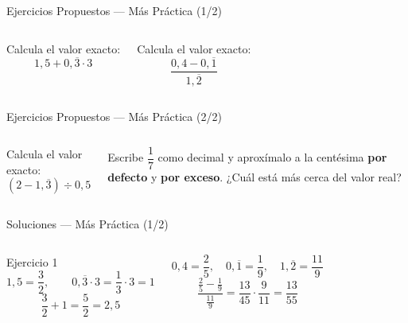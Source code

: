 \documentclass[aspectratio=169]{beamer}
\begin{document}
\begin{frame}{Ejercicios Propuestos — Más Práctica \textnormal{(1/2)}}
  \begin{columns}[T]
    \begin{mwejercicio}
      Calcula el valor exacto:
      \[
        1{,}5 + 0{,}\overline{3} \cdot 3
      \]
    \end{mwejercicio}
    \begin{mwejercicio}
      Calcula el valor exacto:
      \[
        \frac{0{,}4 - 0{,}\overline{1}}{1{,}\overline{2}}
      \]
    \end{mwejercicio}
  \end{columns}
\end{frame}

\begin{frame}{Ejercicios Propuestos — Más Práctica \textnormal{(2/2)}}
  \begin{columns}[T]
    \begin{mwejercicio}
      Calcula el valor exacto:
      \[
        (2 - 1{,}\overline{3}) \div 0{,}5
      \]
    \end{mwejercicio}
    \begin{mwejercicio}
      Escribe $\dfrac{1}{7}$ como decimal y aproxímalo a la centésima
      \textbf{por defecto} y \textbf{por exceso}. ¿Cuál está más cerca
      del valor real?
    \end{mwejercicio}
  \end{columns}
\end{frame}

\begin{frame}{Soluciones — Más Práctica \textnormal{(1/2)}}
  \mwtopanchoroff
  \begin{columns}[T]
    \begin{exampleblock}{Ejercicio 1}
      \[
        1{,}5 = \frac{3}{2}, \qquad
        0{,}\overline{3} \cdot 3 = \frac{1}{3} \cdot 3 = 1
      \]
      \[
        \frac{3}{2} + 1 = \frac{5}{2} = 2{,}5
      \]
    \end{exampleblock}
    \begin{mwextra}[Ejercicio 2]
      \[
        0{,}4 = \frac{2}{5}, \quad
        0{,}\overline{1} = \frac{1}{9}, \quad
        1{,}\overline{2} = \frac{11}{9}
      \]
      \[
        \frac{\frac{2}{5} - \frac{1}{9}}{\frac{11}{9}}
        = \frac{13}{45} \cdot \frac{9}{11}
        = \frac{13}{55}
      \]
    \end{mwextra}
  \end{columns}
  \mwtopanchoron
\end{frame}
\end{document}
